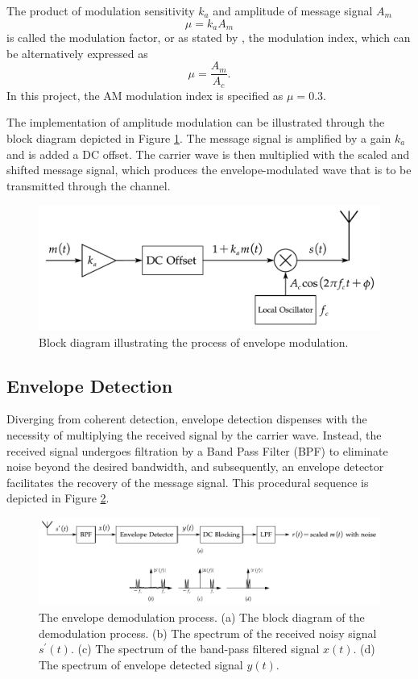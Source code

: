 \documentclass[../ECE459FinalProjectReport.tex]{subfiles}
\begin{document}
The product of modulation sensitivity $k_a$ and amplitude of message signal $A_m$
\begin{equation}
    \mu = k_a A_m
\end{equation}
is called the modulation factor, or as stated by \cite{sasmitaModulationIndexModulation2020}, the modulation index, which can be alternatively expressed as
\begin{equation}
    \mu = \frac{A_m}{A_c}.
\end{equation}
In this project, the AM modulation index is specified as $\mu=0.3$.

The implementation of amplitude modulation can be illustrated through the block diagram depicted in Figure \ref{fig:env-mod}. The message signal is amplified by a gain $k_a$ and is added a DC offset. The carrier wave is then multiplied with the scaled and shifted message signal, which produces the envelope-modulated wave that is to be transmitted through the channel.
\begin{figure}[tb]
    \centering
    \includegraphics[scale=0.5]{plots/env_mod.pdf}
    \caption{Block diagram illustrating the process of envelope modulation.}
    \label{fig:env-mod}
\end{figure}

\subsection{Envelope Detection}
Diverging from coherent detection, envelope detection dispenses with the necessity of multiplying the received signal by the carrier wave. Instead, the received signal undergoes filtration by a Band Pass Filter (BPF) to eliminate noise beyond the desired bandwidth, and subsequently, an envelope detector facilitates the recovery of the message signal. This procedural sequence is depicted in Figure \ref{fig:env-demod}.
\begin{figure}[tb]
    \centering
    \includegraphics[width=\linewidth]{plots/env-demod.pdf}
    \caption{The envelope demodulation process. (a) The block diagram of the demodulation process. (b) The spectrum of the received noisy signal $s^\prime (t)$. (c) The spectrum of the band-pass filtered signal $x(t)$. (d) The spectrum of envelope detected signal $y(t)$.}
    \label{fig:env-demod}
\end{figure}
\end{document}
